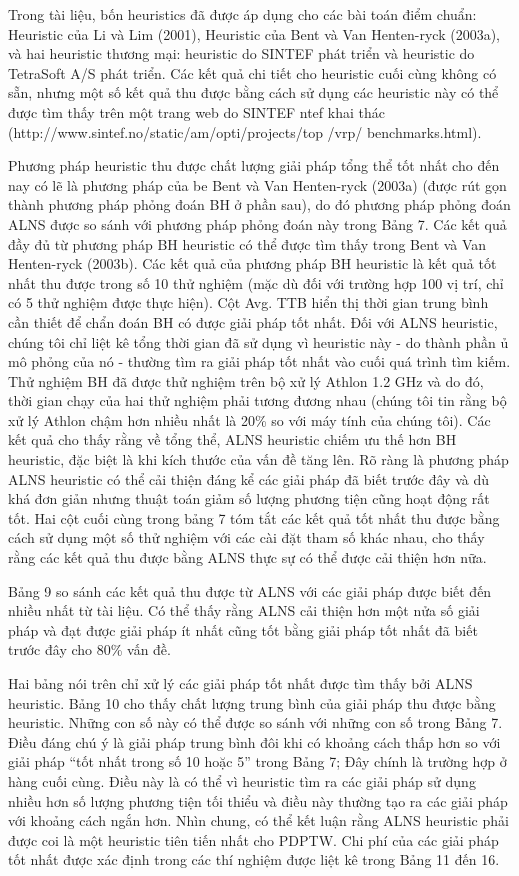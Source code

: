 Trong tài liệu, bốn heuristics đã được áp dụng cho các bài toán điểm chuẩn: Heuristic của Li và Lim (2001), Heuristic của Bent và Van Henten-ryck (2003a), và hai heuristic thương mại: heuristic do SINTEF phát triển và heuristic do TetraSoft A/S phát triển. Các kết quả chi tiết cho heuristic cuối cùng không có sẵn, nhưng một số kết quả thu được bằng cách sử dụng các heuristic này có thể được tìm thấy trên một trang web do SINTEF ntef khai thác (http://www.sintef.no/static/am/opti/projects/top /vrp/ benchmarks.html).

Phương pháp heuristic thu được chất lượng giải pháp tổng thể tốt nhất cho đến nay có lẽ là phương pháp của be Bent và Van Henten-ryck (2003a) (được rút gọn thành phương pháp phỏng đoán BH ở phần sau), do đó phương pháp phỏng đoán ALNS được so sánh với phương pháp phỏng đoán này trong Bảng 7. Các kết quả đầy đủ từ phương pháp BH heuristic có thể được tìm thấy trong Bent và Van Henten-ryck (2003b). Các kết quả của phương pháp BH heuristic là kết quả tốt nhất thu được trong số 10 thử nghiệm (mặc dù đối với trường hợp 100 vị trí, chỉ có 5 thử nghiệm được thực hiện). Cột Avg. TTB hiển thị thời gian trung bình cần thiết để chẩn đoán BH có được giải pháp tốt nhất. Đối với ALNS heuristic, chúng tôi chỉ liệt kê tổng thời gian đã sử dụng vì heuristic này - do thành phần ủ mô phỏng của nó - thường tìm ra giải pháp tốt nhất vào cuối quá trình tìm kiếm. Thử nghiệm BH đã được thử nghiệm trên bộ xử lý Athlon 1.2 GHz và do đó, thời gian chạy của hai thử nghiệm phải tương đương nhau (chúng tôi tin rằng bộ xử lý Athlon chậm hơn nhiều nhất là 20\% so với máy tính của chúng tôi). Các kết quả cho thấy rằng về tổng thể, ALNS heuristic chiếm ưu thế hơn BH heuristic, đặc biệt là khi kích thước của vấn đề tăng lên. Rõ ràng là phương pháp ALNS heuristic có thể cải thiện đáng kể các giải pháp đã biết trước đây và dù khá đơn giản nhưng thuật toán giảm số lượng phương tiện cũng hoạt động rất tốt. Hai cột cuối cùng trong bảng 7 tóm tắt các kết quả tốt nhất thu được bằng cách sử dụng một số thử nghiệm với các cài đặt tham số khác nhau, cho thấy rằng các kết quả thu được bằng ALNS thực sự có thể được cải thiện hơn nữa.

Bảng 9 so sánh các kết quả thu được từ ALNS với các giải pháp được biết đến nhiều nhất từ tài liệu. Có thể thấy rằng ALNS cải thiện hơn một nửa số giải pháp và đạt được giải pháp ít nhất cũng tốt bằng giải pháp tốt nhất đã biết trước đây cho 80\% vấn đề.

Hai bảng nói trên chỉ xử lý các giải pháp tốt nhất được tìm thấy bởi ALNS heuristic. Bảng 10 cho thấy chất lượng trung bình của giải pháp thu được bằng heuristic. Những con số này có thể được so sánh với những con số trong Bảng 7. Điều đáng chú ý là giải pháp trung bình đôi khi có khoảng cách thấp hơn so với giải pháp “tốt nhất trong số 10 hoặc 5” trong Bảng 7; Đây chính là trường hợp ở hàng cuối cùng. Điều này là có thể vì heuristic tìm ra các giải pháp sử dụng nhiều hơn số lượng phương tiện tối thiểu và điều này thường tạo ra các giải pháp với khoảng cách ngắn hơn.
Nhìn chung, có thể kết luận rằng ALNS heuristic phải được coi là một heuristic tiên tiến nhất cho PDPTW. Chi phí của các giải pháp tốt nhất được xác định trong các thí nghiệm được liệt kê trong Bảng 11 đến 16.

